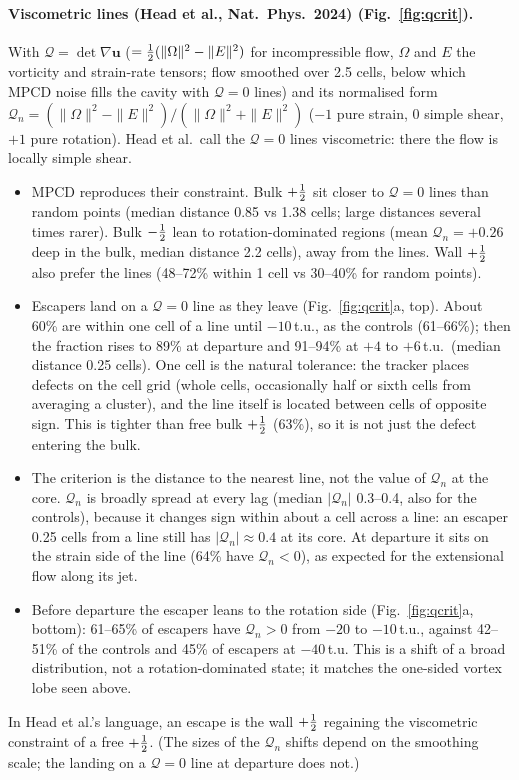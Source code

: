 \paragraph{Viscometric lines (Head et al., Nat.~Phys.~2024) (Fig.~\ref{fig:qcrit}).} With $\mathcal Q=\det\nabla\mathbf u$ ($=\tfrac12(\|\Omega\|^2-\|E\|^2)$ for incompressible flow, $\Omega$ and $E$ the vorticity and strain-rate tensors; flow
smoothed over 2.5 cells, below which MPCD noise fills the cavity with $\mathcal Q=0$ lines) and its normalised form $\mathcal Q_n=(\|\Omega\|^2-\|E\|^2)/(\|\Omega\|^2+\|E\|^2)$
($-1$ pure strain, 0 simple shear, $+1$ pure rotation). Head et al.\ call the $\mathcal Q=0$ lines viscometric: there the flow is locally simple shear.
\begin{itemize}
  \item MPCD reproduces their constraint. Bulk $+\tfrac12$ sit closer to $\mathcal Q=0$ lines than random points (median distance 0.85 vs 1.38 cells; large distances several times rarer).
        Bulk $-\tfrac12$ lean to rotation-dominated regions (mean $\mathcal Q_n=+0.26$ deep in the bulk, median distance 2.2 cells), away from the lines. Wall $+\tfrac12$ also prefer the lines (48--72\% within 1 cell vs 30--40\% for random points).
  \item Escapers land on a $\mathcal Q=0$ line as they leave (Fig.~\ref{fig:qcrit}a, top). About 60\% are within one cell of a line until $-10$\,t.u., as the controls (61--66\%);
        then the fraction rises to 89\% at departure and 91--94\% at $+4$ to $+6$\,t.u.\ (median distance 0.25 cells). One cell is the natural tolerance: the tracker places defects on the cell grid (whole cells, occasionally half or sixth cells
        from averaging a cluster), and the line itself is located between cells of opposite sign. This is tighter than free bulk $+\tfrac12$ (63\%),
        so it is not just the defect entering the bulk.
  \item The criterion is the distance to the nearest line, not the value of $\mathcal Q_n$ at the core. $\mathcal Q_n$ is broadly spread at every lag (median $|\mathcal Q_n|$ 0.3--0.4, also
        for the controls), because it changes sign within about a cell across a line: an escaper 0.25 cells from a line still has $|\mathcal Q_n|\approx0.4$ at its core. At departure it sits
        on the strain side of the line (64\% have $\mathcal Q_n<0$), as expected for the extensional flow along its jet.
  \item Before departure the escaper leans to the rotation side (Fig.~\ref{fig:qcrit}a, bottom): 61--65\% of escapers have $\mathcal Q_n>0$ from $-20$ to $-10$\,t.u., against 42--51\% of the controls
        and 45\% of escapers at $-40$\,t.u. This is a shift of a broad distribution, not a rotation-dominated state; it matches the one-sided vortex lobe seen above.
\end{itemize}
In Head et al.'s language, an escape is the wall $+\tfrac12$ regaining the viscometric constraint of a free $+\tfrac12$. (The sizes of the $\mathcal Q_n$ shifts depend on the smoothing scale;
the landing on a $\mathcal Q=0$ line at departure does not.)

